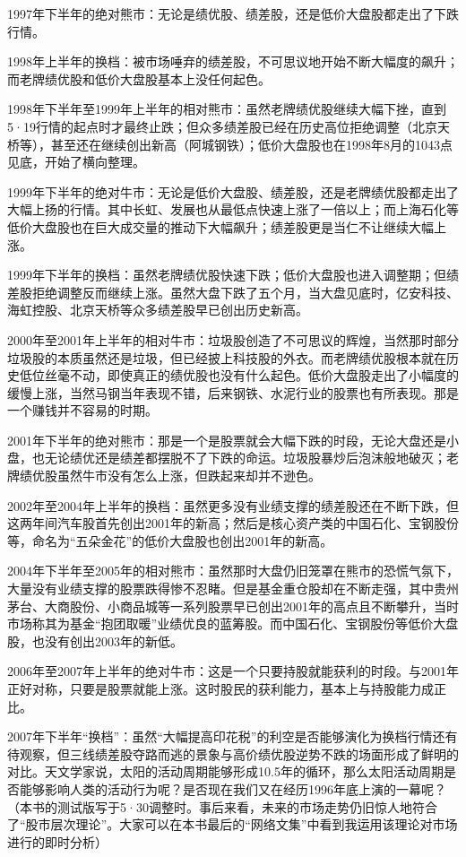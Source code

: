 1997年下半年的绝对熊市：无论是绩优股、绩差股，还是低价大盘股都走出了下跌行情。

1998年上半年的换档：被市场唾弃的绩差股，不可思议地开始不断大幅度的飙升；而老牌绩优股和低价大盘股基本上没任何起色。

1998年下半年至1999年上半年的相对熊市：虽然老牌绩优股继续大幅下挫，直到5·19行情的起点时才最终止跌；但众多绩差股已经在历史高位拒绝调整（北京天桥等），甚至还在继续创出新高（阿城钢铁）；低价大盘股也在1998年8月的1043点见底，开始了横向整理。

1999年下半年的绝对牛市：无论是低价大盘股、绩差股，还是老牌绩优股都走出了大幅上扬的行情。其中长虹、发展也从最低点快速上涨了一倍以上；而上海石化等低价大盘股也在巨大成交量的推动下大幅飙升；绩差股更是当仁不让继续大幅上涨。

1999年下半年的换档：虽然老牌绩优股快速下跌；低价大盘股也进入调整期；但绩差股拒绝调整反而继续上涨。虽然大盘下跌了五个月，当大盘见底时，亿安科技、海虹控股、北京天桥等众多绩差股早已创出历史新高。

2000年至2001年上半年的相对牛市：垃圾股创造了不可思议的辉煌，当然那时部分垃圾股的本质虽然还是垃圾，但已经披上科技股的外衣。而老牌绩优股根本就在历史低位丝毫不动，即使真正的绩优股也没有什么起色。低价大盘股走出了小幅度的缓慢上涨，当然马钢当年表现不错，后来钢铁、水泥行业的股票也有所表现。那是一个赚钱并不容易的时期。

2001年下半年的绝对熊市：那是一个是股票就会大幅下跌的时段，无论大盘还是小盘，也无论绩优还是绩差都摆脱不了下跌的命运。垃圾股暴炒后泡沫般地破灭；老牌绩优股虽然牛市没有怎么上涨，但跌起来却并不逊色。

2002年至2004年上半年的换档：虽然更多没有业绩支撑的绩差股还在不断下跌，但这两年间汽车股首先创出2001年的新高；然后是核心资产类的中国石化、宝钢股份等，命名为“五朵金花”的低价大盘股也创出2001年的新高。

2004年下半年至2005年的相对熊市：虽然那时大盘仍旧笼罩在熊市的恐慌气氛下，大量没有业绩支撑的股票跌得惨不忍睹。但是基金重仓股却在不断走强，其中贵州茅台、大商股份、小商品城等一系列股票早已创出2001年的高点且不断攀升，当时市场称其为基金“抱团取暖”业绩优良的蓝筹股。而中国石化、宝钢股份等低价大盘股，也没有创出2003年的新低。

2006年至2007年上半年的绝对牛市：这是一个只要持股就能获利的时段。与2001年正好对称，只要是股票就能上涨。这时股民的获利能力，基本上与持股能力成正比。

2007年下半年“换档”：虽然“大幅提高印花税”的利空是否能够演化为换档行情还有待观察，但三线绩差股夺路而逃的景象与高价绩优股逆势不跌的场面形成了鲜明的对比。天文学家说，太阳的活动周期能够形成10.5年的循环，那么太阳活动周期是否能够影响人类的活动行为呢？是否现在我们又在经历1996年底上演的一幕呢？（本书的测试版写于5·30调整时。事后来看，未来的市场走势仍旧惊人地符合了“股市层次理论”。大家可以在本书最后的“网络文集”中看到我运用该理论对市场进行的即时分析）

